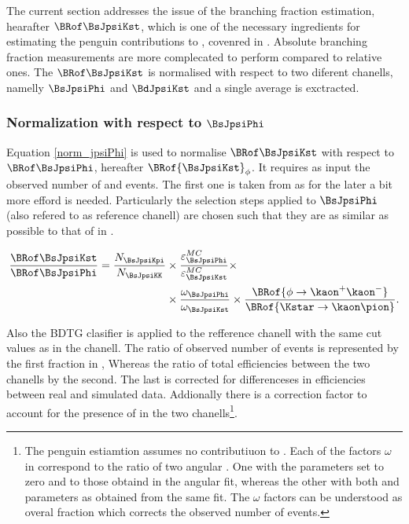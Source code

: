 
The current section addresses the issue of the \BsJpsiKst branching fraction estimation, hearafter $\BRof\BsJpsiKst$,
which is one of the necessary ingredients for estimating the penguin contributions to \phis, covenred in .
Absolute branching fraction measurements are more complecated to perform compared to relative ones. The $\BRof\BsJpsiKst$
is normalised with respect to two diferent chanells, namelly $\BsJpsiPhi$ and $\BdJpsiKst$ and a single average is exctracted.


\subsubsection{Normalization with respect to $\BsJpsiPhi$}
Equation \ref{norm_jpsiPhi} is used to normalise $\BRof\BsJpsiKst$ with respect to $\BRof\BsJpsiPhi$, hereafter $\BRof{\BsJpsiKst}_\phi$.
It requires as input the observed number of \BsJpsiKst and \BsJpsiPhi events. The first one is taken from  as for
the later a bit more efford is needed. Particularly the selection steps applied to $\BsJpsiPhi$ (also refered to as reference chanell)
are chosen such that they are as similar as possible to that of \BsJpsiKst in .

\begin{align}
\frac{\BRof\BsJpsiKst}{\BRof\BsJpsiPhi} = \frac{N_{\BsJpsiKpi}}{N_{\BsJpsiKK}} &\times \frac{\varepsilon_{\BsJpsiPhi}^{MC}}{\varepsilon_{\BsJpsiKst}^{MC}} \times \nonumber \\
                                                                          &\times \frac{\omega_{\BsJpsiPhi}}{\omega_{\BsJpsiKst}} \times \frac{\BRof{\phi\to\kaon^+\kaon^-}}{\BRof{\Kstar\to\kaon\pion}}.
\label{norm_jpsiPhi}
\end{align}

\noindent Also the BDTG clasifier is applied to the refference chanell
with the same cut values as in the \BsJpsiKst chanell. The ratio of observed number of events is represented by the first fraction in ,
Whereas the ratio of total efficiencies between the two chanells by the second. The last is corrected for differenceses in efficiencies between real and
simulated data. Addionally there is a correction factor to account for the presence of \swave in the two
chanells\footnote{The penguin estiamtion assumes no \swave contributiuon to \BsJpsiKst. Each of the factors $\omega$ in  correspond
to the ratio of two angular \pdfs. One with the \swave parameters set to zero and \pwave to those obtaind in the angular fit,  whereas the other
with both \pwave and \swave parameters as obtained from the same fit. The $\omega$ factors can be understood as overal \swave fraction which
corrects the observed number of events.
}.

